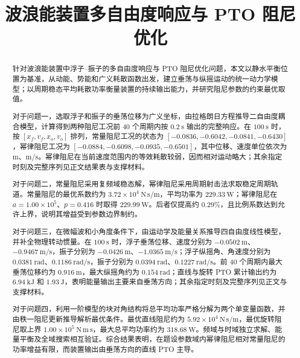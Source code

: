 \documentclass[withoutpreface]{../../../templates/CUMCM2026-Complete-LaTeX/cumcmthesis}
\title{波浪能装置多自由度响应与 PTO 阻尼优化}
\begin{document}
\maketitle

\begin{abstract}
针对波浪能装置中浮子--振子的多自由度响应与 PTO 阻尼优化问题，本文以静水平衡位置为基准，从动能、势能和广义耗散函数出发，建立垂荡与纵摇运动的统一动力学模型；以周期稳态平均耗散功率衡量装置的持续输出能力，并研究阻尼参数的约束最优取值。

对于问题一，选取浮子和振子的垂荡位移为广义坐标，由拉格朗日方程推导二自由度耦合模型，计算得到两种阻尼工况前 $40$ 个周期内按 $0.2\ \mathrm{s}$ 输出的完整响应。在 $100\ \mathrm{s}$ 时，按 $[x_f,v_f,x_o,v_o]$ 排列，常量阻尼工况的状态为 $[-0.0836,-0.6042,-0.0841,-0.6430]$，幂律阻尼工况为 $[-0.0884,-0.6098,-0.0935,-0.6501]$，其中位移、速度单位依次为 $\mathrm{m}$、$\mathrm{m/s}$。幂律阻尼在当前速度范围内的等效耗散较弱，因而相对运动略大；其余指定时刻及完整序列见正文结果表与支撑材料。

对于问题二，常量阻尼采用复频域稳态解，幂律阻尼采用周期射击法求取稳定周期轨道。常量阻尼的最优系数约为 $3.72\times10^4\ \mathrm{N\,s/m}$，平均功率为 $229.33\ \mathrm{W}$；幂律阻尼在 $a=1.00\times10^5$、$p=0.416$ 时取得 $229.99\ \mathrm{W}$。后者仅提高约 $0.29\%$，且比例系数达到允许上界，说明其增益受到参数边界制约。

对于问题三，在微幅波和小角度条件下，由运动学及能量关系推导四自由度线性模型，并补全物理转动惯量。在 $100\ \mathrm{s}$ 时，浮子垂荡位移、速度分别为 $-0.0502\ \mathrm{m}$、$-0.9467\ \mathrm{m/s}$，振子分别为 $-0.0426\ \mathrm{m}$、$-1.0365\ \mathrm{m/s}$；浮子纵摇角、角速度分别为 $0.0381\ \mathrm{rad}$、$0.1186\ \mathrm{rad/s}$，振子分别为 $0.0394\ \mathrm{rad}$、$0.1227\ \mathrm{rad/s}$。前 $40$ 个周期内最大垂荡位移约为 $0.916\ \mathrm{m}$，最大纵摇角约为 $0.154\ \mathrm{rad}$；直线与旋转 PTO 累计输出约为 $6.94\ \mathrm{kJ}$ 和 $1.93\ \mathrm{J}$，表明能量输出主要来自垂荡方向；其余指定时刻及完整序列见正文与支撑材料。

对于问题四，利用一阶模型的块对角结构将总平均功率严格分解为两个单变量函数，并由秩一阻尼更新推导解析最优条件。最优直线阻尼约为 $5.92\times10^4\ \mathrm{N\,s/m}$，最优旋转阻尼取上界 $1.00\times10^5\ \mathrm{N\,m\,s}$，最大总平均功率约为 $318.68\ \mathrm{W}$。频域与时域独立求解、能量平衡及全域搜索相互验证。综合结果表明，在题设参数域内幂律阻尼相对常量阻尼的功率增益有限，而装置输出由垂荡方向的直线 PTO 主导。

\end{abstract}
\end{document}
